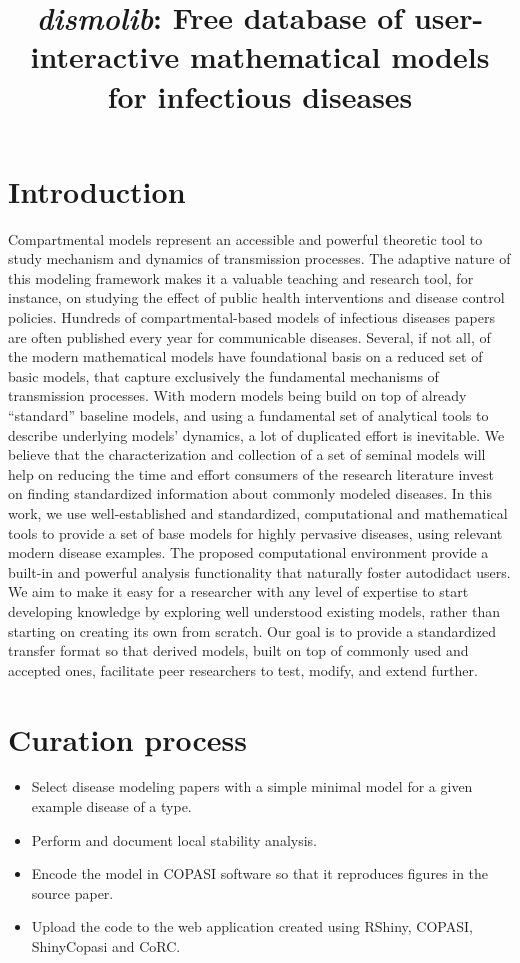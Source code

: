 \documentclass{article}
\title{\textit{dismolib}: Free database of user-interactive mathematical models for infectious diseases}
\author{}
\date{}
\begin{document}
\maketitle

\section{Introduction}
Compartmental models represent an accessible and powerful theoretic tool to study mechanism and dynamics of transmission processes. The adaptive nature of this modeling framework makes it a valuable teaching and research tool, for instance, on studying the effect of public health interventions and disease control policies. Hundreds of compartmental-based models of infectious diseases papers are often published every year for communicable diseases.
%
Several, if not all, of the modern mathematical models have foundational basis on a reduced set of basic models, that capture exclusively the fundamental mechanisms of transmission processes.
With modern models being build on top of already ``standard'' baseline models, and using a fundamental set of analytical tools to describe underlying models' dynamics, a lot of duplicated effort is inevitable.
%
We believe that the characterization and collection of a set of seminal models will help on reducing the time and effort consumers of the research literature invest on finding standardized information about commonly modeled diseases.
%
In this work, we use well-established and standardized, computational and mathematical tools to provide a set of base models for highly pervasive diseases, using relevant modern disease examples.
%
The proposed computational environment provide a built-in and powerful analysis functionality that naturally foster autodidact users. We aim to make it easy for a researcher with any level of expertise to start developing knowledge by exploring well understood existing models, rather than starting on creating its own from scratch. 
%
Our goal is to provide a standardized transfer format so that derived models, built on top of commonly used and accepted ones, facilitate peer researchers to test, modify, and extend further.

\section{Curation process}
\begin{itemize}
    \item Select disease modeling papers with a simple minimal model for a given example disease of a type.
    \item Perform and document local stability analysis.
    \item Encode the model in COPASI software so that it reproduces figures in the source paper.
    \item Upload the code to the web application created using RShiny, COPASI, ShinyCopasi and CoRC.
\end{itemize}
\end{document}
